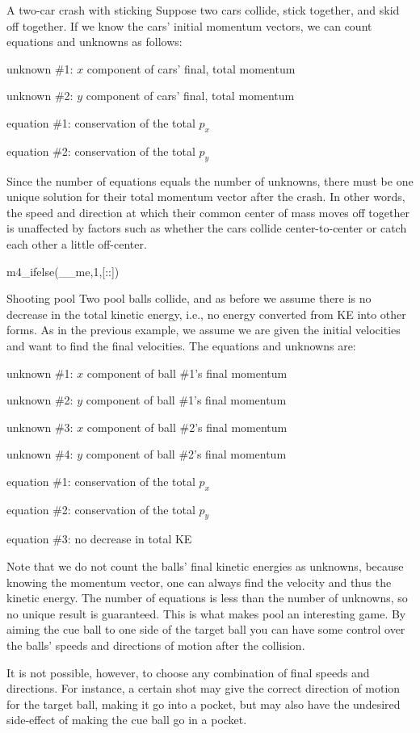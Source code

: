 \begin{eg}{A two-car crash with sticking}
Suppose two cars collide, stick together, and skid off
together. If we know the cars' initial momentum vectors, we
can count equations and unknowns as follows:

unknown \#1: $x$ component of cars' final, total momentum

unknown \#2: $y$ component of cars' final, total momentum

equation \#1: conservation of the total $p_x$

equation \#2: conservation of the total $p_y$

\noindent Since the number of equations equals the number of unknowns,
there must be one unique solution for their total momentum
vector after the crash. In other words, the speed and
direction at which their common center of mass moves off
together is unaffected by factors such as whether the cars
collide center-to-center or catch each other a little off-center.
\end{eg}

m4_ifelse(__me,1,[:\vfill:])

\begin{eg}{Shooting pool}
Two pool balls collide, and as before we assume there is no
decrease in the total kinetic energy, i.e., no energy
converted from KE into other forms. As in the previous
example, we assume we are given the initial velocities and
want to find the final velocities. The equations and unknowns are:

unknown \#1: $x$ component of ball \#1's final momentum

unknown \#2: $y$ component of ball \#1's final momentum

unknown \#3: $x$ component of ball \#2's final momentum

unknown \#4: $y$ component of ball \#2's final momentum

equation \#1: conservation of the total $p_x$

equation \#2: conservation of the total $p_y$

equation \#3: no decrease in total KE

Note that we do not count the balls' final kinetic energies
as unknowns, because knowing the momentum vector, one can
always find the velocity and thus the kinetic energy. The
number of equations is less than the number of unknowns, so
no unique result is guaranteed. This is what makes pool an
interesting game. By aiming the cue ball to one side of the
target ball you can have some control over the balls' speeds
and directions of motion after the collision.

It is not possible, however, to choose any combination of
final speeds and directions. For instance, a certain shot
may give the correct direction of motion for the target
ball, making it go into a pocket, but may also have the
undesired side-effect of making the cue ball go in a pocket.
\end{eg}

